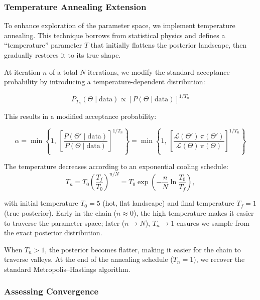 \documentclass[11pt]{article}
\theoremstyle{definition}
\begin{document}
\subsubsection{Temperature Annealing Extension}

To enhance exploration of the parameter space, we implement temperature annealing. This technique borrows from statistical physics and defines a ``temperature'' parameter $T$ that initially flattens the posterior landscape, then gradually restores it to its true shape.

At iteration $n$ of a total $N$ iterations, we modify the standard acceptance probability by introducing a temperature-dependent distribution:

\begin{equation}
P_{T_n}(\Theta\mid\mathrm{data}) \propto [P(\Theta\mid\mathrm{data})]^{1/T_n}
\end{equation}

This results in a modified acceptance probability:

\begin{equation}
\alpha = \min \left\{1,\,
\left[\frac{P(\Theta'\mid\mathrm{data})}{P(\Theta\mid\mathrm{data})}\right]^{1/T_n}
\right\} = \min \left\{1,\,
\left[\frac{\mathcal{L}(\Theta')\,\pi(\Theta')}{\mathcal{L}(\Theta)\,\pi(\Theta)}\right]^{1/T_n}
\right\}
\end{equation}

The temperature decreases according to an exponential cooling schedule: 
\begin{equation}
T_n = T_0\left(\frac{T_f}{T_0}\right)^{n/N}
= T_0\exp\left(-\frac{n}{N}\ln\frac{T_0}{T_f}\right),
\end{equation}

with initial temperature $T_0=5$ (hot, flat landscape) and final temperature $T_f=1$ (true posterior). Early in the chain ($n\approx0$), the high temperature makes it easier to traverse the parameter space; later ($n\to N$), $T_n\to1$ ensures we sample from the exact posterior distribution.

When $T_n > 1$, the posterior becomes flatter, making it easier for the chain to traverse valleys. At the end of the annealing schedule ($T_n = 1$), we recover the standard Metropolis--Hastings algorithm.

\subsubsection{Assessing Convergence}
\end{document}
